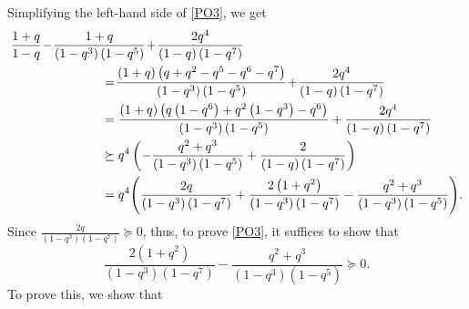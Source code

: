 \documentclass[12pt,reqno]{amsart}
\renewcommand{\(}{\left\(}
\renewcommand{\)}{\right\)}
\numberwithin{equation}{section}
\theoremstyle{plain}
\theoremstyle{definition}
\numberwithin{equation}{section}
\begin{document}
Simplifying the left-hand side of \eqref{PO3}, we get
\begin{align*}
&\frac{1+q}{1-q}\!-\!\frac{1+q}{\left(1-q^3\right)\left(1-q^5\right)}\!+\!\frac{2q^4}{\left(1-q\right)\left(1-q^7\right)}\\
&\hspace{2.5 cm}=\!\frac{\left(1+q\right)\left(q+q^2-q^5-q^6-q^7\right)}{\left(1-q^3\right)\left(1-q^5\right)}\!+\!\frac{2q^4}{\left(1-q\right)\left(1-q^7\right)}\\
&\hspace{2.5 cm}= \frac{\left(1+q\right)\left(q\left(1-q^6\right)+q^2\left(1-q^3\right)-q^6\right)}{\left(1-q^3\right)\left(1-q^5\right)}+\frac{2q^4}{\left(1-q\right)\left(1-q^7\right)}\\
&\hspace{2.5 cm}\succeq q^4\left(-\frac{q^2+q^3}{\left(1-q^3\right)\left(1-q^5\right)}+\frac{2}{\left(1-q\right)\left(1-q^7\right)}\right)\\%
&\hspace{2.5 cm}=q^4\Bigg(\frac{2q}{\left(1-q^3\right)\left(1-q^7\right)}+\frac{2\left(1+q^2\right)}{\left(1-q^3\right)\left(1-q^7\right)}-\frac{q^2+q^3}{\left(1-q^3\right)\left(1-q^5\right)}\Bigg).
\end{align*}
Since $\frac{2q}{\left(1-q^3\right)\left(1-q^7\right)}\succeq 0$, thus, to prove \eqref{PO3}, it suffices to show that 
\begin{equation*}
\frac{2\left(1+q^2\right)}{\left(1-q^3\right)\left(1-q^7\right)}-\frac{q^2+q^3}{\left(1-q^3\right)\left(1-q^5\right)}\succeq 0.
\end{equation*}
To prove this, we show that
\end{document}
